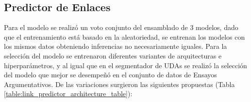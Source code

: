 \begin{table}[h!]
	\begin{center}
	\caption{Métricas de las pruebas del segmentador de UDA.}\label{table:test_metrics_segmenter}
	\end{center}
\end{table}
\begin{table}[h!]
	\begin{center}
	\caption{Métricas BIOES de las pruebas del segmentador de UDA.}\label{table:test_bioes_metrics_segmenter}
	\end{center}
\end{table}

\subsection{Predictor de Enlaces}

Para el modelo se realizó un voto conjunto del ensamblado de 3 modelos, dado que el entrenamiento 
está basado en la aleatoriedad, se entrenan los modelos con los mismos datos obteniendo inferencias no
necesariamente iguales.
Para la selección del modelo se entrenaron diferentes variantes de arquitecturas e hiperparámetros, y 
al igual que en el segmentador de UDAs se realizó la selección del modelo que mejor se desempeñó en 
el conjunto de datos de Ensayos Argumentativos. De las variaciones surgieron las siguientes propuestas
(Tabla \ref{table:link_predictor_architecture_table}):

